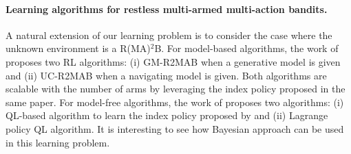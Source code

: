 
\paragraph{Learning algorithms for restless multi-armed multi-action bandits.}
A natural extension of our learning problem is to consider the case where the unknown environment is a R(MA)$^2$B.
For model-based algorithms, the work of \cite{xiong2022learning} proposes two RL algorithms: (i) GM-R2MAB when a generative model is given and (ii) UC-R2MAB when a navigating model is given.
Both algorithms are scalable with the number of arms by leveraging the index policy proposed in the same paper.
For model-free algorithms, the work of \cite{killian2021q} proposes two algorithms: (i) QL-based algorithm to learn the index policy proposed by \cite{glazebrook2011general} and (ii) Lagrange policy QL algorithm.
It is interesting to see how Bayesian approach can be used in this learning problem.




\endgroup
